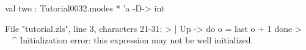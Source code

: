 \runverbatimfalse
{}
\begin{RunVerbatimMsg}
val two : Tutorial0032.modes * 'a -D-> int
\end{RunVerbatimMsg}
\begin{RunVerbatimErr}
File "tutorial.zls", line 3, characters 21-31:
>      | Up -> do o = last o + 1 done
>                     ^^^^^^^^^^
Initialization error: this expression may not be well initialized.
\end{RunVerbatimErr}
